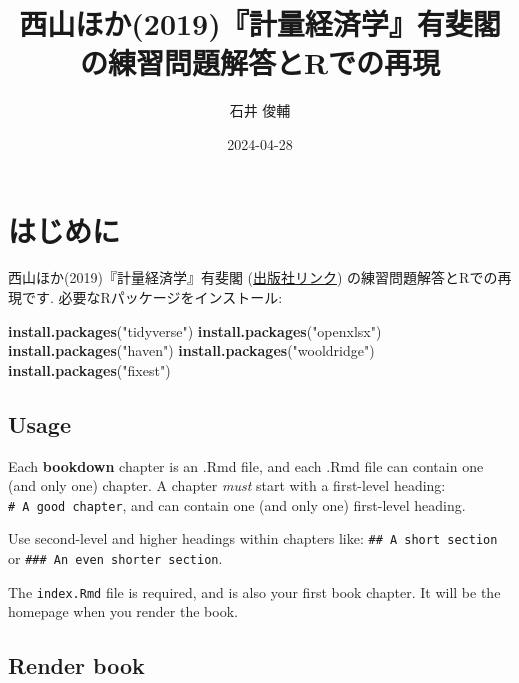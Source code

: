 \documentclass[
]{book}
\title{西山ほか(2019)『計量経済学』有斐閣の練習問題解答とRでの再現}
\author{石井 俊輔}
\date{2024-04-28}
\newenvironment{Shaded}{\begin{snugshade}}{\end{snugshade}}
\newcommand{\FunctionTok}[1]{\textcolor[rgb]{0.13,0.29,0.53}{\textbf{#1}}}
\newcommand{\NormalTok}[1]{#1}
\newcommand{\StringTok}[1]{\textcolor[rgb]{0.31,0.60,0.02}{#1}}
\begin{document}
\maketitle

{
\setcounter{tocdepth}{1}
\tableofcontents
}
\hypertarget{ux306fux3058ux3081ux306b}{%
\chapter*{はじめに}\label{ux306fux3058ux3081ux306b}}

西山ほか(2019)『計量経済学』有斐閣 (\href{https://www.yuhikaku.co.jp/books/detail/9784641053854}{出版社リンク}) の練習問題解答とRでの再現です.
必要なRパッケージをインストール:

\begin{Shaded}
\begin{Highlighting}[]
\FunctionTok{install.packages}\NormalTok{(}\StringTok{"tidyverse"}\NormalTok{)}
\FunctionTok{install.packages}\NormalTok{(}\StringTok{"openxlsx"}\NormalTok{)}
\FunctionTok{install.packages}\NormalTok{(}\StringTok{"haven"}\NormalTok{)}
\FunctionTok{install.packages}\NormalTok{(}\StringTok{"wooldridge"}\NormalTok{)}
\FunctionTok{install.packages}\NormalTok{(}\StringTok{"fixest"}\NormalTok{)}
\end{Highlighting}
\end{Shaded}

\hypertarget{usage}{%
\section{Usage}\label{usage}}

Each \textbf{bookdown} chapter is an .Rmd file, and each .Rmd file can contain one (and only one) chapter. A chapter \emph{must} start with a first-level heading: \texttt{\#\ A\ good\ chapter}, and can contain one (and only one) first-level heading.

Use second-level and higher headings within chapters like: \texttt{\#\#\ A\ short\ section} or \texttt{\#\#\#\ An\ even\ shorter\ section}.

The \texttt{index.Rmd} file is required, and is also your first book chapter. It will be the homepage when you render the book.

\hypertarget{render-book}{%
\section{Render book}\label{render-book}}
\end{document}
